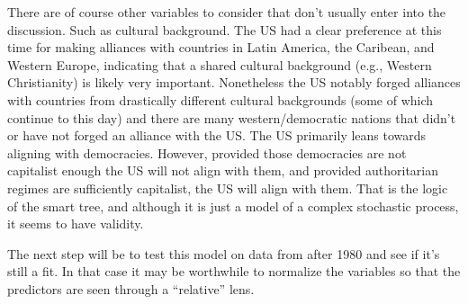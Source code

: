 \documentclass[
]{article}
\begin{document}
There are of course other variables to consider that don't usually enter
into the discussion. Such as cultural background. The US had a clear
preference at this time for making alliances with countries in Latin
America, the Caribean, and Western Europe, indicating that a shared
cultural background (e.g., Western Christianity) is likely very
important. Nonetheless the US notably forged alliances with countries
from drastically different cultural backgrounds (some of which continue
to this day) and there are many western/democratic nations that didn't
or have not forged an alliance with the US. The US primarily leans
towards aligning with democracies. However, provided those democracies
are not capitalist enough the US will not align with them, and provided
authoritarian regimes are sufficiently capitalist, the US will align
with them. That is the logic of the smart tree, and although it is just
a model of a complex stochastic process, it seems to have validity.

The next step will be to test this model on data from after 1980 and see
if it's still a fit. In that case it may be worthwhile to normalize the
variables so that the predictors are seen through a ``relative'' lens.
\end{document}
